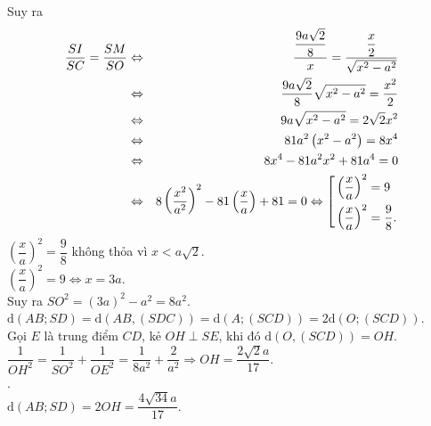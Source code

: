 \begin{ex}
{{		}
		Suy ra
		\begin{eqnarray*}
			\dfrac{SI}{SC}=\dfrac{SM}{SO}& \Leftrightarrow & \dfrac{\dfrac{9a\sqrt{2}}{8}}{x}=\dfrac{\dfrac{x}{2}}{\sqrt{x^2-a^2}}\\
			& \Leftrightarrow &\dfrac{9a\sqrt{2}}{8}\sqrt{x^2-a^2}=\dfrac{x^2}{2}\\
			&\Leftrightarrow & 9a\sqrt{x^2-a^2}=2\sqrt{2}x^2 \\
			&\Leftrightarrow & 81a^2\left(x^2-a^2\right)=8x^4  \\
			& \Leftrightarrow & 8x^4-81a^2x^2+81a^4=0 \\
			& \Leftrightarrow &  8\left(\dfrac{x^2}{a^2}\right)^2-81\left(\dfrac{x}{a}\right)+81=0\Leftrightarrow\left[\begin{aligned}&\left(\dfrac{x}{a}\right)^2=9\\&\left(\dfrac{x}{a}\right)^2=\dfrac{9}{8}.\end{aligned}\right.  
		\end{eqnarray*} 
		$\left(\dfrac{x}{a}\right)^2=\dfrac{9}{8}$ không thỏa vì $x<a\sqrt{2}$.\\
		$\left(\dfrac{x}{a}\right)^2=9\Leftrightarrow x=3a$.\\
		Suy ra $SO^2=(3a)^2-a^2=8a^2$.\\
		$\mathrm{d}(AB;SD)=\mathrm{d}\left(AB,(SDC)\right)=\mathrm{d}\left(A;(SCD)\right)=2\mathrm{d}\left(O;(SCD)\right)$.\\
		Gọi $E$ là trung điểm $CD$, kẻ $OH\perp SE$, khi đó $\mathrm{d}\left(O,(SCD)\right)=OH$.\\
		$\dfrac{1}{OH^2}=\dfrac{1}{SO^2}+\dfrac{1}{OE^2}=\dfrac{1}{8a^2}+\dfrac{2}{a^2}\Rightarrow OH=\dfrac{2\sqrt{2}a}{17}$.\\
		.\\
		$\mathrm{d}(AB;SD)=2OH=\dfrac{4\sqrt{34}a}{17}$.	
	}
\end{ex}
